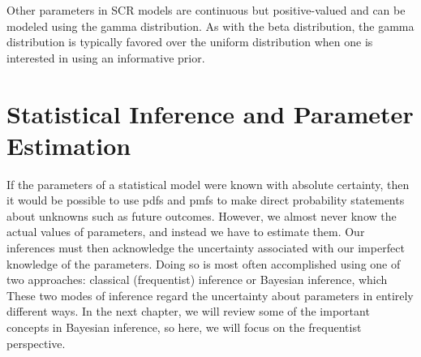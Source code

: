 Other parameters in SCR models are continuous but
positive-valued and can be modeled using the gamma distribution. As
with the beta distribution, the gamma distribution is typically
favored over the uniform distribution when one is interested in using
an informative prior.



\section{Statistical Inference and Parameter Estimation}

If the parameters of a statistical model were known with absolute
certainty, then it would be possible to
use pdfs and pmfs to make direct
probability statements about unknowns such as future outcomes. However, we
almost never know the actual values of parameters, and instead we have
to estimate them. Our inferences must then acknowledge the uncertainty
associated with our imperfect knowledge of the parameters. Doing so is
most often accomplished using one of two approaches:
classical (frequentist) inference or Bayesian
inference, which
These two modes of inference
regard the uncertainty about parameters in
entirely different ways. In the next chapter, we will review some of
the important concepts in Bayesian inference, so here, we will
focus on the frequentist perspective.


